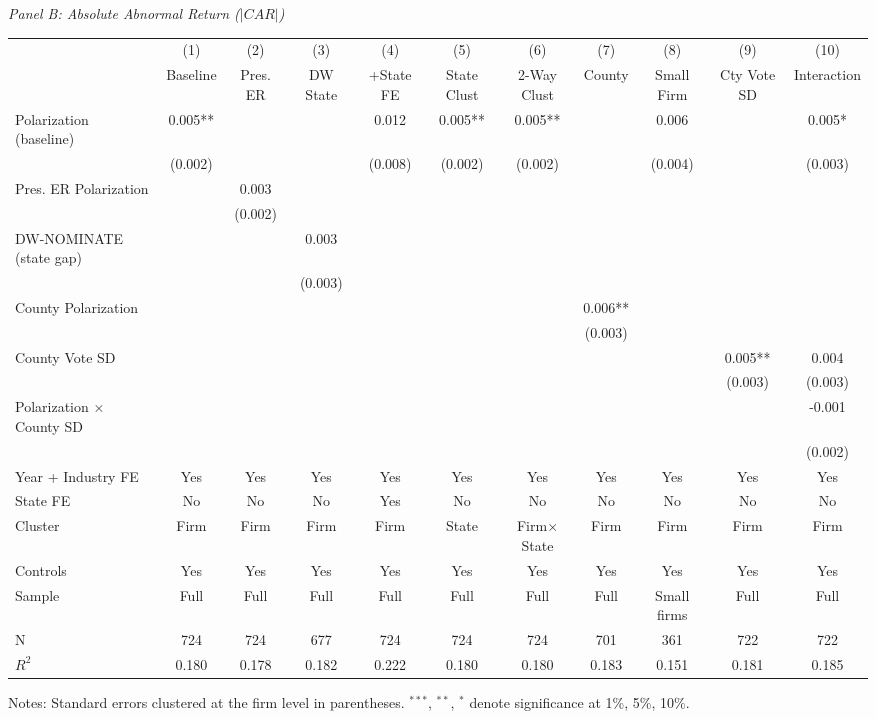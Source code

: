 \begin{table}[htbp]
\textit{Panel B: Absolute Abnormal Return ($|CAR|$)}
\vspace{2pt}
\begin{tabular}{lcccccccccc}
\toprule
 & (1) & (2) & (3) & (4) & (5) & (6) & (7) & (8) & (9) & (10) \\
 & Baseline & Pres. ER & DW State & +State FE & State Clust & 2-Way Clust & County & Small Firm & Cty Vote SD & Interaction \\
\midrule
Polarization (baseline) & 0.005** &  &  & 0.012 & 0.005** & 0.005** &  & 0.006 &  & 0.005* \\
 & (0.002) &  &  & (0.008) & (0.002) & (0.002) &  & (0.004) &  & (0.003) \\
Pres. ER Polarization &  & 0.003 &  &  &  &  &  &  &  &  \\
 &  & (0.002) &  &  &  &  &  &  &  &  \\
DW-NOMINATE (state gap) &  &  & 0.003 &  &  &  &  &  &  &  \\
 &  &  & (0.003) &  &  &  &  &  &  &  \\
County Polarization &  &  &  &  &  &  & 0.006** &  &  &  \\
 &  &  &  &  &  &  & (0.003) &  &  &  \\
County Vote SD &  &  &  &  &  &  &  &  & 0.005** & 0.004 \\
 &  &  &  &  &  &  &  &  & (0.003) & (0.003) \\
Polarization $\times$ County SD &  &  &  &  &  &  &  &  &  & -0.001 \\
 &  &  &  &  &  &  &  &  &  & (0.002) \\
\midrule
Year + Industry FE & Yes & Yes & Yes & Yes & Yes & Yes & Yes & Yes & Yes & Yes \\
State FE & No & No & No & Yes & No & No & No & No & No & No \\
Cluster & Firm & Firm & Firm & Firm & State & Firm$\times$State & Firm & Firm & Firm & Firm \\
Controls & Yes & Yes & Yes & Yes & Yes & Yes & Yes & Yes & Yes & Yes \\
Sample & Full & Full & Full & Full & Full & Full & Full & Small firms & Full & Full \\
N & 724 & 724 & 677 & 724 & 724 & 724 & 701 & 361 & 722 & 722 \\
$R^2$ & 0.180 & 0.178 & 0.182 & 0.222 & 0.180 & 0.180 & 0.183 & 0.151 & 0.181 & 0.185 \\
\bottomrule
\end{tabular}
\begin{flushleft}
\footnotesize Notes: Standard errors clustered at the firm level in parentheses. $^{***}$, $^{**}$, $^{*}$ denote significance at 1\%, 5\%, 10\%.
\end{flushleft}
\end{table}
